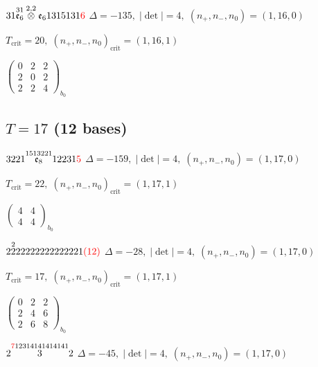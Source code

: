 \documentclass[10pt]{article}
\begin{document}
$31\overset{31}{\mathfrak{e}_6}\overset{2,2}{\otimes}\mathfrak{e}_61315131\textcolor{red}{6}$ \quad $\Delta=-135,\; |\det|=4,\; (n_+,n_-,n_0)=(1,16,0)$

\hspace{1em}$T_{\text{crit}}=20,\; (n_+,n_-,n_0)_{\text{crit}}=(1,16,1)$

\hspace{2em}$\left(\begin{smallmatrix}0 & 2 & 2 \\ 2 & 0 & 2 \\ 2 & 2 & 4\end{smallmatrix}\right)_{\!b_0}$


\subsection*{$T = 17$ \quad (12 bases)}
\smallskip

$3221\overset{1513221}{\mathfrak{e}_8}12231\textcolor{red}{5}$ \quad $\Delta=-159,\; |\det|=4,\; (n_+,n_-,n_0)=(1,17,0)$

\hspace{1em}$T_{\text{crit}}=22,\; (n_+,n_-,n_0)_{\text{crit}}=(1,17,1)$

\hspace{2em}$\left(\begin{smallmatrix}4 & 4 \\ 4 & 4\end{smallmatrix}\right)_{\!b_0}$

\smallskip

$2\overset{2}{2}22222222222221\textcolor{red}{(12)}$ \quad $\Delta=-28,\; |\det|=4,\; (n_+,n_-,n_0)=(1,17,0)$

\hspace{1em}$T_{\text{crit}}=17,\; (n_+,n_-,n_0)_{\text{crit}}=(1,17,1)$

\hspace{2em}$\left(\begin{smallmatrix}0 & 2 & 2 \\ 2 & 4 & 6 \\ 2 & 6 & 8\end{smallmatrix}\right)_{\!b_0}$

\smallskip

$2\overset{\textcolor{red}{7}12314141414141}{3}2$ \quad $\Delta=-45,\; |\det|=4,\; (n_+,n_-,n_0)=(1,17,0)$
\end{document}
